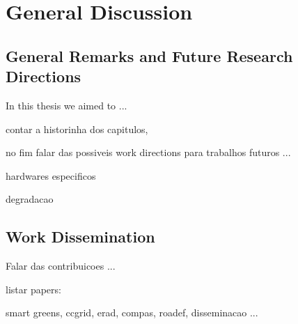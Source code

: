 \chapter{General Discussion}
\label{chap-conclusion}

\section{General Remarks and Future Research Directions}

In this thesis we aimed to ... 

contar a historinha dos capitulos,

no fim falar das possiveis work directions para trabalhos futuros ...

hardwares especificos

degradacao

\section{Work Dissemination}

Falar das contribuicoes ...

listar papers:

smart greens,
ccgrid,
erad, compas, roadef, disseminacao ...
